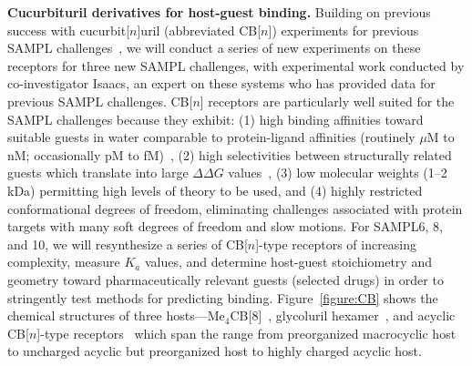 \documentclass[11pt]{article}
\begin{document}
\textbf{Cucurbituril derivatives for host-guest binding.} 
Building on previous success with cucurbit[$n$]uril (abbreviated CB[$n$]) experiments for previous SAMPL challenges~\cite{ma_acyclic_2012-2, cao_absolute_2014, she_glycoluril-derived_2016}, we will conduct a series of new experiments on these receptors for three new SAMPL challenges,
 with experimental work conducted by co-investigator Isaacs, an expert on these systems who has provided data for previous SAMPL challenges.
CB[$n$] receptors are particularly well suited for the SAMPL challenges because they exhibit: (1) high binding affinities toward suitable guests in water comparable to protein-ligand affinities (routinely $\mu$M to nM; occasionally pM to fM)~\cite{cao_attomolar_2014, liu_cucurbituril_2005, mock_structure_1986, assaf_cucurbiturils:_2015, moghaddam_new_2011, shetty_can_2015, biedermann_release_2012}, (2) high selectivities between structurally related guests which translate into large $\Delta \Delta G$ values~\cite{isaacs_stimuli_2014}, (3) low molecular weights (1--2 kDa) permitting high levels of theory to be used, and (4) highly restricted conformational degrees of freedom, eliminating challenges associated with protein targets with many soft degrees of freedom and slow motions.  
For SAMPL6, 8, and 10, we will resynthesize a series of CB[$n$]-type receptors of increasing complexity, measure $K_a$ values, and determine host-guest stoichiometry and geometry toward pharmaceutically relevant guests (selected drugs) in order to stringently test methods for predicting binding.  
Figure~\ref{figure:CB} shows the chemical structures of three hosts---Me$_4$CB[8]~\cite{vinciguerra_synthesis_2015}, glycoluril hexamer~\cite{lucas_templated_2011}, and acyclic CB[$n$]-type receptors~\cite{ma_acyclic_2012, ma_acyclic_2012-1, zhang_acyclic_2014, gilberg_acyclic_2015, sigwalt_acyclic_2016, zhang_acyclic_2014-1} which span the range from preorganized macrocyclic host to uncharged acyclic but preorganized host to highly charged acyclic host.
\end{document}
